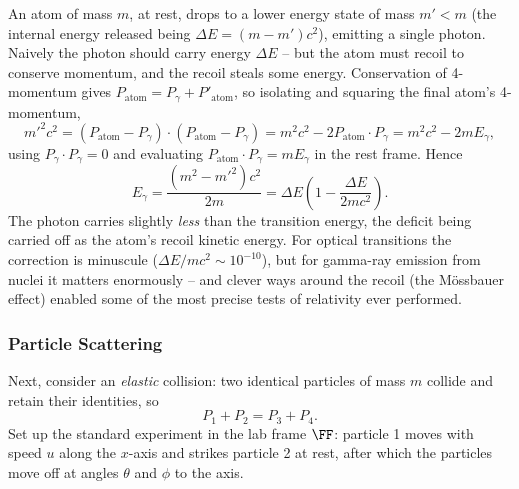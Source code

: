 \documentclass[a4paper]{scrartcl}
\begin{document}
\begin{example}
	An atom of mass $m$, at rest, drops to a lower energy state of mass $m' < m$ (the internal energy released being $\Delta E = (m - m')c^2$), emitting a single photon. Naively the photon should carry energy $\Delta E$ -- but the atom must recoil to conserve momentum, and the recoil steals some energy. Conservation of 4-momentum gives $P_{\text{atom}} = P_\gamma + P'_{\text{atom}}$, so isolating and squaring the final atom's 4-momentum,
	$$
	m'^2 c^2 = (P_{\text{atom}} - P_\gamma)\cdot(P_{\text{atom}} - P_\gamma) = m^2c^2 - 2 P_{\text{atom}} \cdot P_\gamma = m^2 c^2 - 2m E_\gamma,
	$$
	using $P_\gamma \cdot P_\gamma = 0$ and evaluating $P_{\text{atom}}\cdot P_\gamma = mE_\gamma$ in the rest frame. Hence
	$$
	E_\gamma = \frac{(m^2 - m'^2)c^2}{2m} = \Delta E \left(1 - \frac{\Delta E}{2mc^2}\right).
	$$
	The photon carries slightly \emph{less} than the transition energy, the deficit being carried off as the atom's recoil kinetic energy. For optical transitions the correction is minuscule ($\Delta E/mc^2 \sim 10^{-10}$), but for gamma-ray emission from nuclei it matters enormously -- and clever ways around the recoil (the M\"ossbauer effect) enabled some of the most precise tests of relativity ever performed.
\end{example}

\subsubsection{Particle Scattering}

Next, consider an \emph{elastic} collision: two identical particles of mass $m$ collide and retain their identities, so
$$
P_1 + P_2 = P_3 + P_4.
$$
Set up the standard experiment in the lab frame $\FF$: particle 1 moves with speed $u$ along the $x$-axis and strikes particle 2 at rest, after which the particles move off at angles $\theta$ and $\phi$ to the axis.
\end{document}
